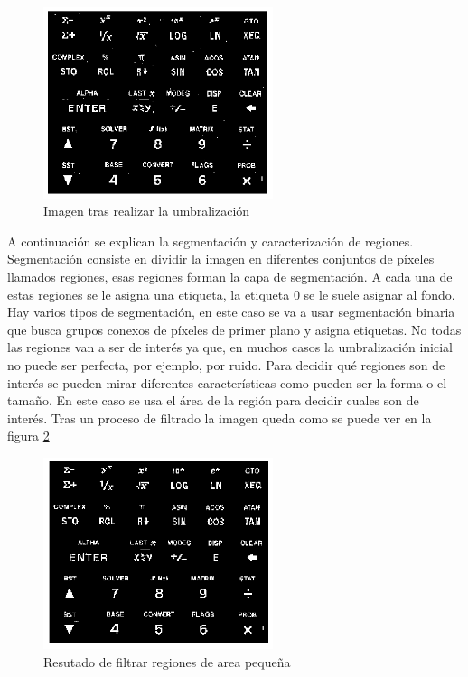 \documentclass[a4paper,12pt]{report}
\begin{document}
\begin{figure}[h]
\centering
\includegraphics[width=0.6\textwidth]{imagenes/thresholding}
\caption{Imagen tras realizar la umbralización}
\label{thresholding}
\end{figure}
A continuación se explican la segmentación y caracterización de regiones. Segmentación consiste en dividir la imagen en diferentes conjuntos de píxeles llamados regiones, esas regiones forman la capa de segmentación. A cada una de estas regiones se le asigna una etiqueta, la etiqueta 0 se le suele asignar al fondo.\\

Hay varios tipos de segmentación, en este caso se va a usar segmentación binaria que busca grupos conexos de píxeles de primer plano y asigna etiquetas. No todas las regiones van a ser de interés ya que, en muchos casos la umbralización inicial no puede ser perfecta, por ejemplo, por ruido. Para decidir qué regiones son de interés se pueden mirar diferentes características como pueden ser la forma o el tamaño. En este caso se usa el área de la región para decidir cuales son de interés. Tras un proceso de filtrado la imagen queda como se puede ver en la figura \ref{filtersmallareas}\\


\begin{figure}[h]
\centering
\includegraphics[width=0.6\textwidth]{imagenes/filtersmallareas}
\caption{Resutado de filtrar regiones de area pequeña}
\label{filtersmallareas}
\end{figure}
\end{document}
